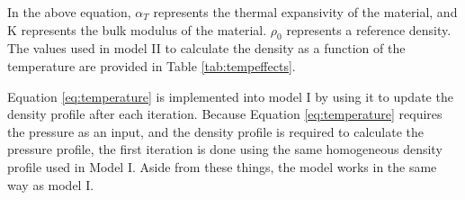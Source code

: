 \documentclass[twocolumn]{article}
\begin{document}
In the above equation, $\alpha_T$ represents the thermal expansivity of the material, and K represents the bulk modulus of the material. $\rho_0$ represents a reference density. The values used in model II to calculate the density as a function of the temperature are provided in Table \ref{tab:tempeffects}.
\begin{table}[]
	\caption{The values used to determine the density at each point in the profile.}
	\label{tab:tempeffects}
\end{table}
Equation \ref{eq:temperature} is implemented into model I by using it to update the density profile after each iteration. Because Equation \ref{eq:temperature} requires the pressure as an input, and the density profile is required to calculate the pressure profile, the first iteration is done using the same homogeneous density profile used in Model I. Aside from these things, the model works in the same way as model I.
\end{document}
